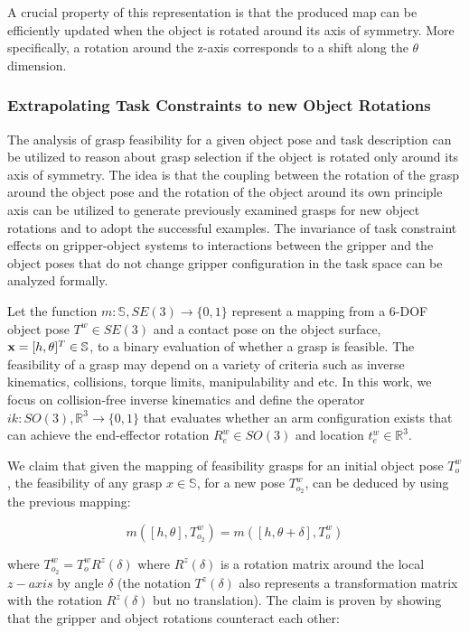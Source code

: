 \documentclass[a4paper,10pt,twocolumn]{article}
\begin{document}
A crucial property of this representation is that the produced map can
be efficiently updated when the object is rotated around its axis of symmetry. More specifically, a rotation around the z-axis corresponds to a shift along the $\theta$ dimension. 

\subsubsection{Extrapolating Task Constraints to new Object Rotations}
The analysis of grasp feasibility for a given object pose and task description can be utilized to reason
about grasp selection if the object is rotated only around its axis of symmetry. The idea is that the 
coupling between the rotation of the grasp around the object pose and the rotation of the object around
its own principle axis can be utilized to generate previously examined grasps for new object rotations
and to adopt the successful examples. The invariance of task constraint effects on gripper-object
systems to interactions between the gripper and the object poses that do not change gripper configuration
in the task space can be analyzed formally. 

Let the function $m: \mathbb{S}, SE(3) \rightarrow \{0,1\}$ represent a mapping from a 6-DOF object pose $T^w \in SE(3)$ and a contact pose on the object surface, $\textbf{x} = [h, \theta]^T \in \mathbb{S}$, to a binary evaluation of whether a grasp is feasible. The feasibility of a grasp may depend on a variety
of criteria such as inverse kinematics, collisions, torque limits, manipulability and etc. In this work,
we focus on collision-free inverse kinematics and define the operator $ik: SO(3), \mathbb{R}^3 \rightarrow \{0,1\}$
that evaluates whether an arm configuration exists that can achieve the end-effector rotation $R^w_e \in SO(3)$ and location $t^w_e \in \mathbb{R}^3$. 

We claim that given the mapping of feasibility grasps for an initial object pose $T^w_o$, the feasibility of any 
grasp $x \in \mathbb{S}$, for a new pose $T^w_{o_2}$, can be deduced by using the previous mapping:

\begin{equation}
  m([h,\theta],T^w_{o_2}) = m([h,\theta+\delta], T^w_o)
\end{equation}

\noindent where $T^w_{o_2} = T^w_o R^z(\delta)$ where $R^z(\delta)$ is a rotation matrix around the
local $z-axis$ by angle $\delta$ (the notation $T^z(\delta)$ also represents a
transformation matrix with the rotation $R^z(\delta)$ but no translation). The claim is proven
by showing that the gripper and object rotations counteract each other:
\end{document}
